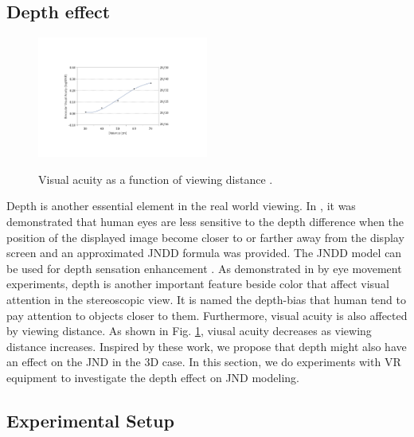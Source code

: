 \documentclass[journal]{IEEEtran}
\begin{document}
\subsection{Depth effect}
\begin{figure}[!t]
	\centering
	\includegraphics[width=0.5\textwidth]{acuity_distance}\\
	\caption{Visual acuity as a function of viewing distance \cite{Alfonso2007Prospective}.}
	\label{fig:AcuityDistance}
\end{figure}
Depth is another essential element in the real world viewing. In \cite{RN636}, it was demonstrated that human eyes are less sensitive to the depth difference when the position of the displayed image become closer to or farther away from the display screen and an approximated JNDD formula was provided. The JNDD model can be used for depth sensation enhancement \cite{RN641}. As demonstrated in \cite{RN150,RN138,RN148} by eye movement experiments, depth is another important feature beside color that affect visual attention in the stereoscopic view. It is named the depth-bias that human tend to pay attention to objects closer to them. Furthermore, visual acuity is also affected by viewing distance. As shown in Fig. \ref{fig:AcuityDistance}, viusal acuity decreases as viewing distance increases. Inspired by these work, we propose that depth might also have an effect on the JND in the 3D case. In this section, we do experiments with VR equipment to investigate the depth effect on JND modeling. 

\subsection{Experimental Setup}
\end{document}
